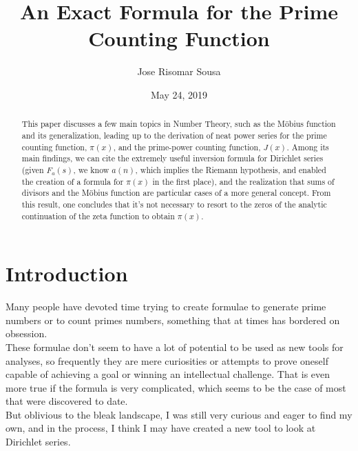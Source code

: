\documentclass[12pt]{article}
\begin{document}
\title{An Exact Formula for the Prime Counting Function}
\date{May 24, 2019} %
\author{Jose Risomar Sousa}
\maketitle
{}

\begin{abstract}
This paper discusses a few main topics in Number Theory, such as the M\"{o}bius function and its generalization, leading up to the derivation of neat power series for the prime counting function, $\pi(x)$, and the prime-power counting function, $J(x)$. Among its main findings, we can cite the extremely useful inversion formula for Dirichlet series (given $F_a(s)$, we know $a(n)$, which implies the Riemann hypothesis, and enabled the creation of a formula for $\pi(x)$ in the first place), and the realization that sums of divisors and the M\"{o}bius function are particular cases of a more general concept. From this result, one concludes that it's not necessary to resort to the zeros of the analytic continuation of the zeta function to obtain $\pi(x)$.
\end{abstract}

\tableofcontents

\section{Introduction}
Many people have devoted time trying to create formulae to generate prime numbers or to count primes numbers, something that at times has bordered on obsession.\\

These formulae don't seem to have a lot of potential to be used as new tools for analyses, so frequently they are mere curiosities or attempts to prove oneself capable of achieving a goal or winning an intellectual challenge. That is even more true if the formula is very complicated, which seems to be the case of most that were discovered to date.\\

But oblivious to the bleak landscape, I was still very curious and eager to find my own, and in the process, I think I may have created a new tool to look at Dirichlet series.\\
\end{document}
